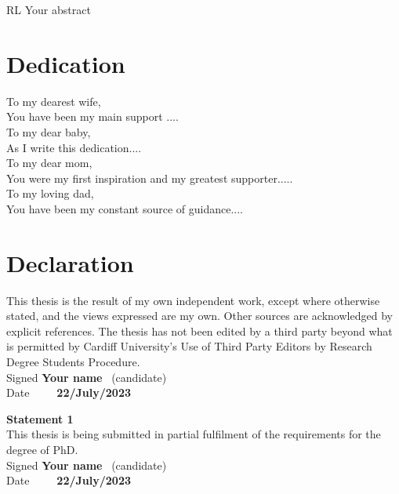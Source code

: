 \documentclass[12pt]{book}
\begin{document}
\ac{RL} Your abstract


\chapter*{Dedication}

To my dearest wife,
\\

You have been my main support ....
\\


\noindent To my dear baby,
\\

As I write this dedication....
\\

\noindent To my dear mom,
\\

You were my first inspiration and my greatest supporter.....
\\

\noindent To my loving dad,
\\

You have been my constant source of guidance....


\chapter*{Declaration}

This thesis is the result of my own independent work, except where otherwise stated,
and the views expressed are my own. Other sources are acknowledged by explicit
references. The thesis has not been edited by a third party beyond what is permitted
by Cardiff University's Use of Third Party Editors by Research Degree Students
Procedure.\\[2ex]
Signed \textbf{Your name} \ (candidate) \hspace*{10em}\\[1ex]
Date\ \ \ \ \ \textbf{22/July/2023} \hspace*{18em}
\vfill

\noindent\textbf{\large Statement 1}\\[1ex]
This thesis is being submitted in partial fulfilment of the requirements for the degree of PhD.\\[2ex]
Signed \textbf{Your name} \ (candidate) \hspace*{10em}\\[1ex]
Date\ \ \ \ \ \textbf{22/July/2023} \hspace*{18em}
\vfill
\end{document}
